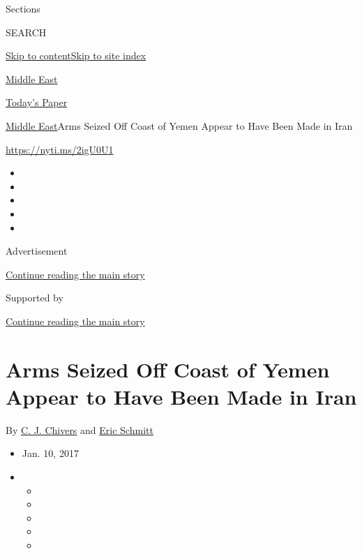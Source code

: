Sections

SEARCH

\protect\hyperlink{site-content}{Skip to
content}\protect\hyperlink{site-index}{Skip to site index}

\href{https://www.nytimes.com/section/world/middleeast}{Middle East}

\href{https://myaccount.nytimes.com/auth/login?response_type=cookie\&client_id=vi}{}

\href{https://www.nytimes.com/section/todayspaper}{Today's Paper}

\href{/section/world/middleeast}{Middle East}\textbar{}Arms Seized Off
Coast of Yemen Appear to Have Been Made in Iran

\url{https://nyti.ms/2igU0U1}

\begin{itemize}
\item
\item
\item
\item
\item
\end{itemize}

Advertisement

\protect\hyperlink{after-top}{Continue reading the main story}

Supported by

\protect\hyperlink{after-sponsor}{Continue reading the main story}

\hypertarget{arms-seized-off-coast-of-yemen-appear-to-have-been-made-in-iran}{%
\section{Arms Seized Off Coast of Yemen Appear to Have Been Made in
Iran}\label{arms-seized-off-coast-of-yemen-appear-to-have-been-made-in-iran}}

By \href{http://www.nytimes.com/by/c-j-chivers}{C. J. Chivers} and
\href{http://www.nytimes.com/by/eric-schmitt}{Eric Schmitt}

\begin{itemize}
\item
  Jan. 10, 2017
\item
  \begin{itemize}
  \item
  \item
  \item
  \item
  \item
  \end{itemize}
\end{itemize}

